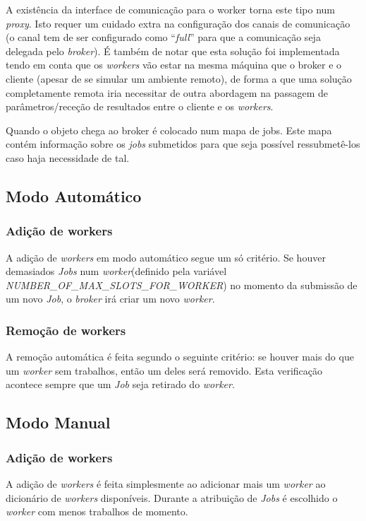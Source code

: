 \documentclass[a4paper]{article}
\begin{document}
A existência da interface de comunicação para o worker torna este tipo num \emph{proxy}. Isto requer um cuidado extra na configuração dos canais de comunicação (o canal tem de ser configurado como "`\emph{full}"' para que a comunicação seja delegada pelo \emph{broker}). É também de notar que esta solução foi implementada tendo em conta que os \emph{workers} vão estar na mesma máquina que o broker e o cliente (apesar de se simular um ambiente remoto), de forma a que uma solução completamente remota iria necessitar de outra abordagem na passagem de parâmetros/receção de resultados entre o cliente e os \emph{workers}.

Quando o objeto chega ao broker é colocado num mapa de jobs. Este mapa contém informação sobre os \emph{jobs} submetidos para que seja possível ressubmetê-los caso haja necessidade de tal.

\subsection{Modo Automático}
\subsubsection{Adição de workers}
A adição de \emph{workers} em modo automático segue um só critério. Se houver demasiados \emph{Jobs} num \emph{worker}(definido pela variável \emph{NUMBER\_OF\_MAX\_SLOTS\_FOR\_WORKER}) no momento da submissão de um novo \emph{Job}, o \emph{broker} irá criar um novo \emph{worker}.

\subsubsection{Remoção de workers}
A remoção automática é feita segundo o seguinte critério: se houver mais do que um \emph{worker} sem trabalhos, então um deles será removido. Esta verificação acontece sempre que um \emph{Job} seja retirado do \emph{worker}.

\subsection{Modo Manual}
\subsubsection{Adição de workers}
A adição de \emph{workers} é feita simplesmente ao adicionar mais um \emph{worker} ao dicionário de \emph{workers} disponíveis. Durante a atribuição de \emph{Jobs} é escolhido o \emph{worker} com menos trabalhos de momento.
\end{document}
